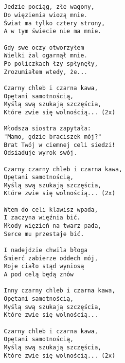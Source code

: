 \documentclass[12pt]{article}
\begin{document}
\subsection*{}
\begin{verbatim}
Jedzie pociąg, złe wagony,
Do więzienia wiozą mnie.
Świat ma tylko cztery strony,
A w tym świecie nie ma mnie.

Gdy swe oczy otworzyłem
Wielki żal ogarnął mnie.
Po policzkach łzy spłynęły,
Zrozumiałem wtedy, że...

Czarny chleb i czarna kawa,
Opętani samotnością,
Myślą swą szukają szczęścia,
Które zwie się wolnością... (2x)

Młodsza siostra zapytała:
"Mamo, gdzie braciszek mój?"
Brat Twój w ciemnej celi siedzi!
Odsiaduje wyrok swój.

Czarny czarny chleb i czarna kawa,
Opętani samotnością,
Myślą swą szukają szczęścia,
Które zwie się wolnością... (2x)

Wtem do celi klawisz wpada,
I zaczyna więźnia bić.
Młody więzień na twarz pada,
Serce mu przestaje bić.

I nadejdzie chwila błoga
Śmierć zabierze oddech mój,
Moje ciało stąd wyniosą
A pod celą będą znów

Inny czarny chleb i czarna kawa,
Opętani samotnością,
Myślą swą szukają szczęścia,
Które zwie się wolnością...

Czarny chleb i czarna kawa,
Opętani samotnością,
Myślą swą szukają szczęścia,
Które zwie się wolnością... (2x)
\end{verbatim}
\clearpage
\end{document}
